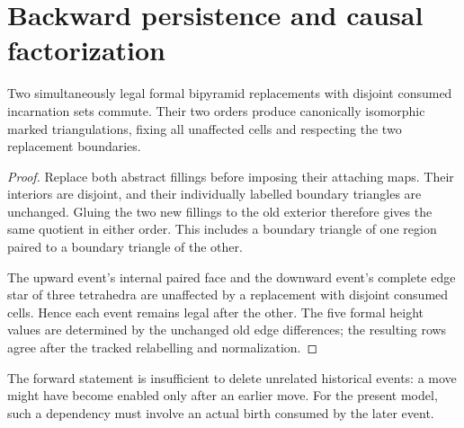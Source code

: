 \section{Backward persistence and causal factorization}\label{sec:causality}

\begin{lemma}\label{lem:forward}
Two simultaneously legal formal bipyramid replacements with disjoint
consumed incarnation sets commute. Their two orders produce canonically
isomorphic marked triangulations, fixing all unaffected cells and respecting
the two replacement boundaries.
\end{lemma}
\begin{proof}
Replace both abstract fillings before imposing their attaching maps. Their
interiors are disjoint, and their individually labelled boundary triangles
are unchanged. Gluing the two new fillings to the old exterior therefore
gives the same quotient in either order. This includes a boundary triangle
of one region paired to a boundary triangle of the other.

The upward event's internal paired face and the downward event's complete
edge star of three tetrahedra are unaffected by a replacement with disjoint
consumed cells. Hence each event remains legal after the other. The five
formal height values are determined by the unchanged old edge differences;
the resulting rows agree after the tracked relabelling and normalization.
\end{proof}

The forward statement is insufficient to delete unrelated historical events:
a move might have become enabled only after an earlier move. For the present
model, such a dependency must involve an actual birth consumed by the later
event.


